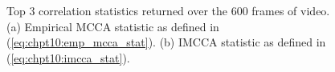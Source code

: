 \begin{figure}
  \begin{center}
    \caption{Top 3 correlation statistics returned over the 600 frames of video. (a)
      Empirical MCCA statistic as defined in (\ref{eq:chpt10:emp_mcca_stat}). (b) IMCCA
      statistic as defined in (\ref{eq:chpt10:imcca_stat}).}
    \label{fig:chpt10:mcca_corrs}
  \end{center}
\end{figure}




